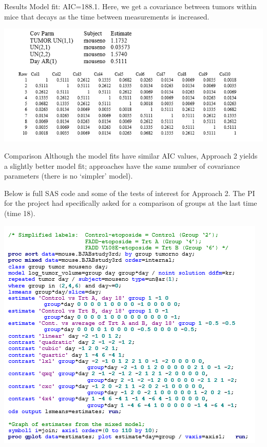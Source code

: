 \documentclass[
  9pt,
  ignorenonframetext,
]{beamer}
\begin{document}
\begin{frame}{Results}
\protect\hypertarget{results-1}{}
Model fit: AIC=188.1. Here, we get a covariance between tumors within
mice that decays as the time between measurements is increased.

\begin{center}\includegraphics[width=1\linewidth]{figs_L11/f3} \end{center}
\end{frame}

\begin{frame}{Comparison}
\protect\hypertarget{comparison}{}
Although the model fits have similar AIC values, Approach 2 yields a
slightly better model fit; approaches have the same number of covariance
parameters (there is no `simpler' model).

Below is full SAS code and some of the tests of interest for Approach 2.
The PI for the project had specifically asked for a comparison of groups
at the last time (time 18).

\begin{center}\includegraphics[width=0.7\linewidth]{figs_L11/f4} \end{center}
\end{frame}
\end{document}
